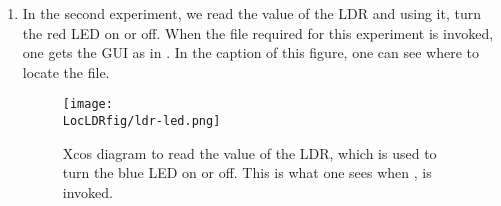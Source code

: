 \begin{enumerate}

\item In the second experiment, we read the value of the LDR and using
  it, turn the red LED on or off.  When the file required for this
  experiment is invoked, one gets the GUI as in .
  In the caption of this figure, one can see where to locate the file.

  \begin{figure}
    \centering
    \texttt{[image: \\LocLDRfig/ldr-led.png]}
    \caption[Xcos diagram to read the value of the LDR, which is used
    to turn the blue LED on or off] {Xcos diagram to read the value of
      the LDR, which is used to turn the blue LED on or off.  This is
      what one sees when , is
      invoked.}
    \label{fig:ldr-led}
  \end{figure}


\end{enumerate}
